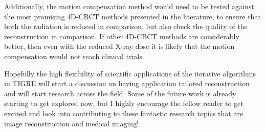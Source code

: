 Additionally, the motion compensation method would need to be tested against the most promising  4D-CBCT methods presented in the literature, to ensure that both the radiation is reduced in comparison, but also check the quality of the reconstruction in comparison. If other 4D-CBCT methods are considerably better, then even with the reduced X-ray dose it is likely that the motion compensation would not reach clinical trials.

Hopefully the high flexibility of scientific applications of the iterative algorithms in TIGRE will start a discussion on having application tailored reconstruction and will start research across the field. Some of the future work is already starting to get explored now, but I highly encourage the fellow reader to get excited and look into contributing to these fantastic research topics that are image reconstruction and medical imaging!

